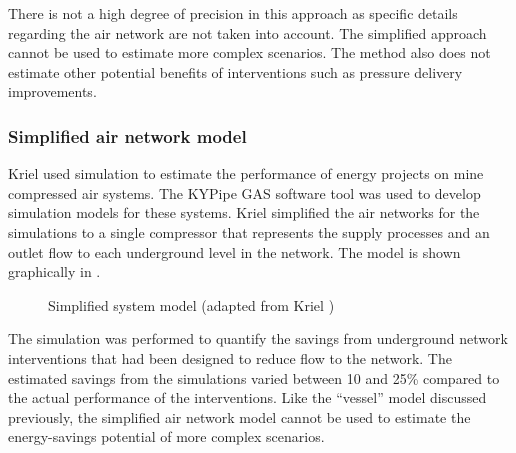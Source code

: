 		There is not a high degree of precision in this approach as specific details regarding the air network are not taken into account. The simplified approach cannot be used to estimate more complex scenarios. The method also does not estimate other potential benefits of interventions such as pressure delivery improvements.
		
		\subsubsection{Simplified air network model}
		Kriel \cite{Kriel2014Masters} used simulation to estimate the performance of energy projects on mine compressed air systems. The KYPipe GAS software tool was used to develop simulation models for these systems. Kriel simplified the air networks for the simulations to a single compressor that represents the supply processes and an outlet flow to each underground level in the network. The model is shown graphically in .
		\begin{figure}[h!]
			\centering
			\caption[Simplified system model]{Simplified system model (adapted from Kriel \cite{Kriel2014Masters})}
			\label{fig:kriel model}
		\end{figure}
		\par 
		The simulation was performed to quantify the savings from underground network interventions that had been designed to reduce flow to the network. The estimated savings from the simulations varied between 10 and 25\% compared to the actual performance of the interventions. Like the \enquote{vessel} model discussed previously, the simplified air network model cannot be used to estimate the energy-savings potential of more complex scenarios.
